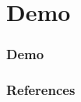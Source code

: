 \documentclass{beamer}
\begin{document}
\section{Demo}
\begin{frame}
   \frametitle{Demo}
   \begin{figure}[!htbp]
   \begin{center}
   \end{center}
   \end{figure}
\end{frame}

\begin{frame}[allowframebreaks]
\def\newblock{\hskip .11em plus .33em minus .07em}
\frametitle{References}
\nocite{*}

\end{frame}
\end{document}
